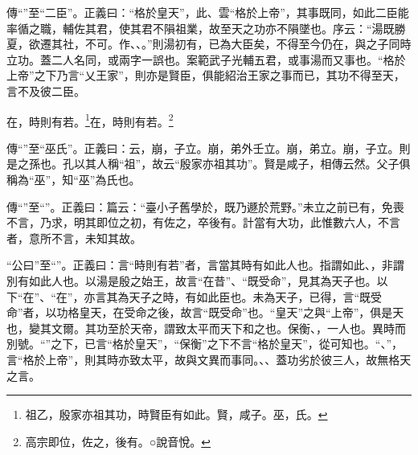 {\noindent\zhuan{}\fzbyks 傳“”至“二臣”。正義曰：“格於皇天”，此、雲“格於上帝”，其事既同，如此二臣能率循之職，輔佐其君，使其君不隕祖業，故至天之功亦不隕墜也。序云：“湯既勝夏，欲遷其社，不可。作、、。”則湯初有，已為大臣矣，不得至今仍在，與之子同時立功。蓋二人名同，或兩字一誤也。案範武子光輔五君，或事湯而又事也。“格於上帝”之下乃言“乂王家”，則亦是賢臣，俱能紹治王家之事而已，其功不得至天，言不及彼二臣。 \par}

在，時則有若。\footnote{祖乙，殷家亦祖其功，時賢臣有如此。賢，咸子。巫，氏。}在，時則有若。\footnote{高宗即位，佐之，後有。○說音悅。}

{\noindent\zhuan{}\fzbyks 傳“”至“巫氏”。正義曰：云，崩，子立。崩，弟外壬立。崩，弟立。崩，子立。則是之孫也。孔以其人稱“祖”，故云“殷家亦祖其功”。賢是咸子，相傳云然。父子俱稱為“巫”，知“巫”為氏也。 \par}

{\noindent\zhuan{}\fzbyks 傳“”至“”。正義曰：篇云：“臺小子舊學於，既乃遯於荒野。”未立之前已有，免喪不言，乃求，明其即位之初，有佐之，卒後有。計當有大功，此惟數六人，不言者，意所不言，未知其故。 \par}

{\noindent\shu{}\fzkt “公曰”至“”。正義曰：言“時則有若”者，言當其時有如此人也。指謂如此、，非謂別有如此人也。以湯是殷之始王，故言“在昔”、“既受命”，見其為天子也。以下“在”、“在”，亦言其為天子之時，有如此臣也。未為天子，已得，言“既受命”者，以功格皇天，在受命之後，故言“既受命”也。“皇天”之與“上帝”，俱是天也，變其文爾。其功至於天帝，謂致太平而天下和之也。保衡、，一人也。異時而別號。“”之下，已言“格於皇天”，“保衡”之下不言“格於皇天”，從可知也。“、”，言“格於上帝”，則其時亦致太平，故與文異而事同。、、蓋功劣於彼三人，故無格天之言。 \par}

